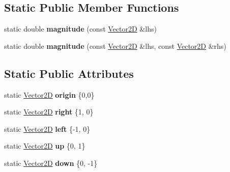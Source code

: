 \subsection*{Static Public Member Functions}
\begin{DoxyCompactItemize}
\item 
\mbox{\label{class_vector2_d_a73d35a880a2f3d262b14ac8aaf5914db}} 
static double {\bfseries magnitude} (const \hyperlink{class_vector2_d}{Vector2D} \&lhs)
\item 
\mbox{\label{class_vector2_d_ac7b3cebbfa7c84c9750c30a6c030ffa8}} 
static double {\bfseries magnitude} (const \hyperlink{class_vector2_d}{Vector2D} \&lhs, const \hyperlink{class_vector2_d}{Vector2D} \&rhs)
\end{DoxyCompactItemize}
\subsection*{Static Public Attributes}
\begin{DoxyCompactItemize}
\item 
\mbox{\label{class_vector2_d_aa7a23308562639dc04b9fe30b2e30008}} 
static \hyperlink{class_vector2_d}{Vector2D} {\bfseries origin} \{0,0\}
\item 
\mbox{\label{class_vector2_d_aa48eacf081c0ffd578ff0687bd261580}} 
static \hyperlink{class_vector2_d}{Vector2D} {\bfseries right} \{1, 0\}
\item 
\mbox{\label{class_vector2_d_a9de8398e8d132c017571a911bf20d242}} 
static \hyperlink{class_vector2_d}{Vector2D} {\bfseries left} \{-\/1, 0\}
\item 
\mbox{\label{class_vector2_d_a5ea1302008e7f6827a1153cd3d5f3ef7}} 
static \hyperlink{class_vector2_d}{Vector2D} {\bfseries up} \{0, 1\}
\item 
\mbox{\label{class_vector2_d_aadd75c5ef76f3f4071c6fe1a2dc27c7b}} 
static \hyperlink{class_vector2_d}{Vector2D} {\bfseries down} \{0, -\/1\}
\end{DoxyCompactItemize}
